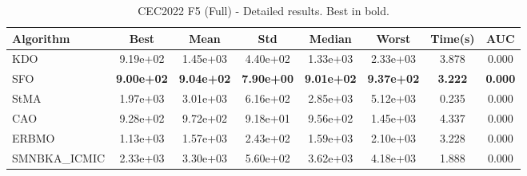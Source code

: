 \begin{table}[H]
\centering\small
\caption{CEC2022 F5 (Full) - Detailed results. Best in bold.}
\label{tab:cec2022_F5}
\begin{tabular}{lccccccc}
\toprule
\textbf{Algorithm} & \textbf{Best} & \textbf{Mean} & \textbf{Std} & \textbf{Median} & \textbf{Worst} & \textbf{Time(s)} & \textbf{AUC} \\
\midrule
KDO & 9.19e+02 & 1.45e+03 & 4.40e+02 & 1.33e+03 & 2.33e+03 & 3.878 & 0.000 \\
SFO & \textbf{9.00e+02} & \textbf{9.04e+02} & \textbf{7.90e+00} & \textbf{9.01e+02} & \textbf{9.37e+02} & \textbf{3.222} & \textbf{0.000} \\
StMA & 1.97e+03 & 3.01e+03 & 6.16e+02 & 2.85e+03 & 5.12e+03 & 0.235 & 0.000 \\
CAO & 9.28e+02 & 9.72e+02 & 9.18e+01 & 9.56e+02 & 1.45e+03 & 4.337 & 0.000 \\
ERBMO & 1.13e+03 & 1.57e+03 & 2.43e+02 & 1.59e+03 & 2.10e+03 & 3.228 & 0.000 \\
SMNBKA_ICMIC & 2.33e+03 & 3.30e+03 & 5.60e+02 & 3.62e+03 & 4.18e+03 & 1.888 & 0.000 \\
\bottomrule
\end{tabular}
\end{table}
